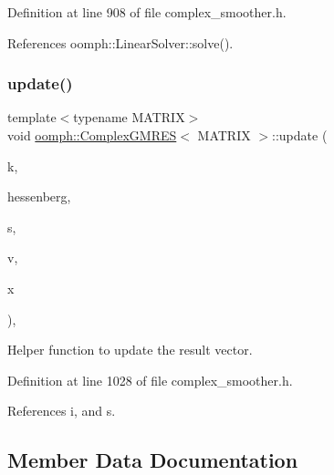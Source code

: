 Definition at line 908 of file complex\+\_\+smoother.\+h.



References oomph\+::\+Linear\+Solver\+::solve().

\mbox{\label{classoomph_1_1ComplexGMRES_a0c6df8b6c50a0ccd344a62654b1411d0}} 
\subsubsection{\texorpdfstring{update()}{update()}}
{\footnotesize\ttfamily template$<$typename M\+A\+T\+R\+IX$>$ \\
void \hyperlink{classoomph_1_1ComplexGMRES}{oomph\+::\+Complex\+G\+M\+R\+ES}$<$ M\+A\+T\+R\+IX $>$\+::update (\begin{DoxyParamCaption}\item[{const unsigned \&}]{k,  }\item[{const \hyperlink{classoomph_1_1Vector}{Vector}$<$ \hyperlink{classoomph_1_1Vector}{Vector}$<$ std\+::complex$<$ double $>$ $>$ $>$ \&}]{hessenberg,  }\item[{const \hyperlink{classoomph_1_1Vector}{Vector}$<$ std\+::complex$<$ double $>$ $>$ \&}]{s,  }\item[{const \hyperlink{classoomph_1_1Vector}{Vector}$<$ \hyperlink{classoomph_1_1Vector}{Vector}$<$ \hyperlink{classoomph_1_1DoubleVector}{Double\+Vector} $>$ $>$ \&}]{v,  }\item[{\hyperlink{classoomph_1_1Vector}{Vector}$<$ \hyperlink{classoomph_1_1DoubleVector}{Double\+Vector} $>$ \&}]{x }\end{DoxyParamCaption})\hspace{0.3cm}{\ttfamily [inline]}, {\ttfamily [private]}}



Helper function to update the result vector. 



Definition at line 1028 of file complex\+\_\+smoother.\+h.



References i, and s.



\subsection{Member Data Documentation}
\mbox{\label{classoomph_1_1ComplexGMRES_a208aaa9528d6b08afa5324f77ac70581}} 
